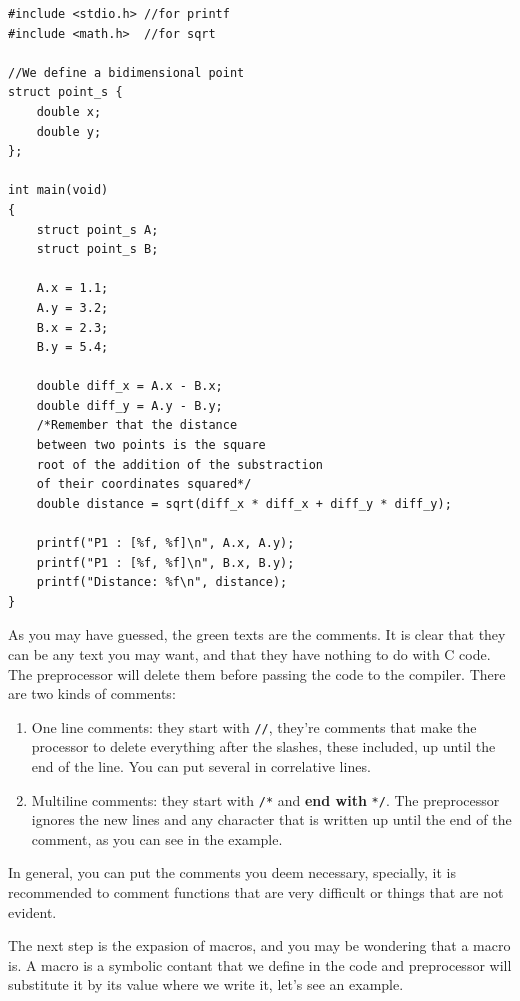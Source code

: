 \documentclass[a4paper]{article}
\begin{document}
\noindent
\begin{minipage}[H]{\linewidth}
\mbox{}
\begin{lstlisting}[style=C,
caption={Example of program with comments},
label={lst:comments1}]
#include <stdio.h> //for printf
#include <math.h>  //for sqrt

//We define a bidimensional point
struct point_s {
    double x;
    double y;
};

int main(void)
{
    struct point_s A;
    struct point_s B;

    A.x = 1.1;
    A.y = 3.2;
    B.x = 2.3;
    B.y = 5.4;

    double diff_x = A.x - B.x;
    double diff_y = A.y - B.y;
    /*Remember that the distance
    between two points is the square
    root of the addition of the substraction
    of their coordinates squared*/
    double distance = sqrt(diff_x * diff_x + diff_y * diff_y);

    printf("P1 : [%f, %f]\n", A.x, A.y);
    printf("P1 : [%f, %f]\n", B.x, B.y);
    printf("Distance: %f\n", distance);
}
\end{lstlisting}
\end{minipage}

As you may have guessed, the green texts are the comments. It is clear that they
can be any text you may want, and that they have nothing to do with C code.
The preprocessor will delete them before passing the code to the compiler.
There are two kinds of comments:
\begin{enumerate}
\item One line comments: they start with \verb!//!, they're comments that
make the processor to delete everything after the slashes, these included, up
until the end of the line. You can put several in correlative lines.
\item Multiline comments: they start with \verb!/*! and \textbf{end with}
\verb!*/!. The preprocessor ignores the new lines and any character that is
written up until the end of the comment, as you can see in the example.
\end{enumerate}

In general, you can put the comments you deem necessary, specially, it is
recommended to comment functions that are very difficult or things that are not
evident.

The next step is the expasion of macros, and you may be wondering that a macro
is. A macro is a symbolic contant that we define in the code and preprocessor
will substitute it by its value where we write it, let's see an example.
\end{document}
